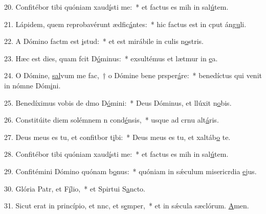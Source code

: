 20. Confitébor tibi quóniam xaud\uline{í}sti me:~* et factus es mih in sal\uline{ú}tem.\par 
21. Lápidem, quem reprobavérunt ædfic\uline{á}ntes:~* hic factus est in cput áng\uline{u}li.\par 
22. A Dómino factm est \uline{i}stud:~* et est mirábile in culis n\uline{o}stris.\par 
23. Hæc est dies, quam fcit D\uline{ó}minus:~* exsultémus et lætmur in \uline{e}a.\par 
24. O Dómine, \uline{sal}vum me fac,~† o Dómine bene prsper\uline{á}re:~* benedíctus qui venit in nómne Dóm\uline{i}ni.\par 
25. Benedíximus vobis de dmo D\uline{ó}mini:~* Deus Dóminus, et llúxit n\uline{o}bis.\par 
26. Constitúite diem solémnem n cond\uline{é}nsis,~* usque ad crnu alt\uline{á}ris.\par 
27. Deus meus es tu, et confitbor t\uline{i}bi:~* Deus meus es tu, et xaltáb\uline{o} te.\par 
28. Confitébor tibi quóniam xaud\uline{í}sti me:~* et factus es mih in sal\uline{ú}tem.\par 
29. Confitémini Dómino quónam b\uline{o}nus:~* quóniam in sǽculum misericrdia \uline{e}jus.\par 
30. Glória Patr, et F\uline{í}lio,~* et Spirtui S\uline{a}ncto.\par 
31. Sicut erat in princípio, et nnc, et s\uline{e}mper,~* et in sǽcula sæclórum. \uline{A}men.\par 
